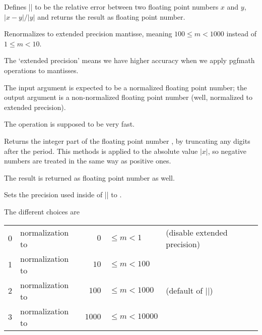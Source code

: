 \begin{command}{\pgfmathfloatrelerror{}}
	Defines |\pgfmathresult| to be the relative error between two floating point numbers $x$ and $y$, $\lvert x - y\rvert / \lvert y \rvert $ and returns the result as floating point number.
\end{command}
\begin{command}{}
Renormalizes  to extended precision mantisse, meaning
$100 \le m < 1000$ instead of $1 \le m < 10$.

The `extended precision' means we have higher accuracy when we apply pgfmath operations to mantisses.

The input argument is expected to be a normalized floating point number; the output argument is a non-normalized floating point number (well, normalized to extended precision).

The operation is supposed to be very fast.
\end{command}
\begin{command}{\pgfmathfloatint{}}
Returns the integer part of the floating point number , by truncating any digits after the period. This methods is applied to the absolute value $\rvert x \lvert$, so negative numbers are treated in the same way as positive ones.

The result is returned as floating point number as well.
\end{command}

\begin{command}{\pgfmathfloatsetextprecision{}}
	Sets the precision used inside of |\pgfmathfloattoextentedprecision| to .

	The different choices are
	
	\begin{tabular}{llrll}
	0 & normalization to &    $0$ & $\le m < 1$ 	& (disable extended precision)\\
	1 & normalization to &   $10$ & $\le m < 100$	\\
	2 & normalization to & 	$100$ & $\le m < 1000$	& (default of |\pgfmathfloattoextentedprecision|)\\
	3 & normalization to & $1000$ & $\le m < 10000$	\\
	\end{tabular}
\end{command}

